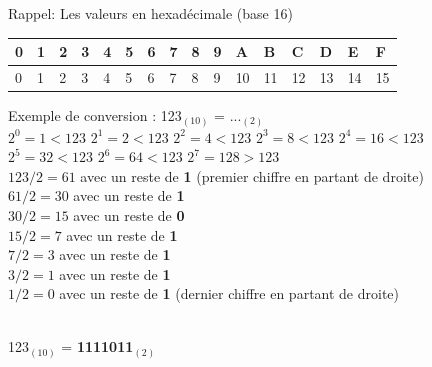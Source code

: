 \begin{Exercice}[20 minutes]
\begin{conseil}
            
            Rappel: Les valeurs en hexadécimale (base 16)\\
            \begin{tabular}{| C{0.030\textwidth} | C{0.030\textwidth} | C{0.030\textwidth} | C{0.030\textwidth} | C{0.030\textwidth} | C{0.030\textwidth} | C{0.030\textwidth} | C{0.030\textwidth} | C{0.030\textwidth} | C{0.030\textwidth} | C{0.030\textwidth} | C{0.030\textwidth} | C{0.030\textwidth} | C{0.030\textwidth} | C{0.030\textwidth} | C{0.030\textwidth} |} 
            \hline
            \textbf{0} & \textbf{1} & \textbf{2} & \textbf{3} & \textbf{4} & \textbf{5} & \textbf{6} & \textbf{7} & \textbf{8} & \textbf{9} & \textbf{A} & \textbf{B} & \textbf{C} & \textbf{D} & \textbf{E} & \textbf{F}\\ [0.5ex]
             & 1 & 2 & 3 & 4 & 5 & 6 & 7 & 8 & 9 & 10 & 11 & 12 & 13 & 14 & 15 \\ [0.5ex] 
            \hline
        \end{tabular}
        
        Exemple de conversion : 123$_{(10)}$ = ...$_{(2)}$\\
        
        $2^0 = 1 < 123$\qquad
        $2^1 = 2 < 123$\qquad
        $2^2 = 4 < 123$\qquad
        $2^3 = 8 < 123$\qquad
        $2^4 = 16 < 123$\qquad
        $2^5 = 32 < 123$\qquad
        $2^6 = 64 < 123$\qquad
        $2^7 = 128 > 123$\\
        
        $123 / 2 = 61$ avec un reste de \textbf{1} (premier chiffre en partant de droite)\\
        $61 / 2 = 30$ avec un reste de \textbf{1}\\
        $30 / 2 = 15$ avec un reste de \textbf{0}\\
        $15 / 2 = 7$ avec un reste de \textbf{1}\\
        $7 / 2 = 3$ avec un reste de \textbf{1}\\
        $3 / 2 = 1$ avec un reste de \textbf{1}\\
        $1 / 2 = 0$ avec un reste de \textbf{1} (dernier chiffre en partant de droite)\\\
        
        123$_{(10)}$ = \textbf{1111011$_{(2)}$}\\
        

\end{conseil}
\end{Exercice}
